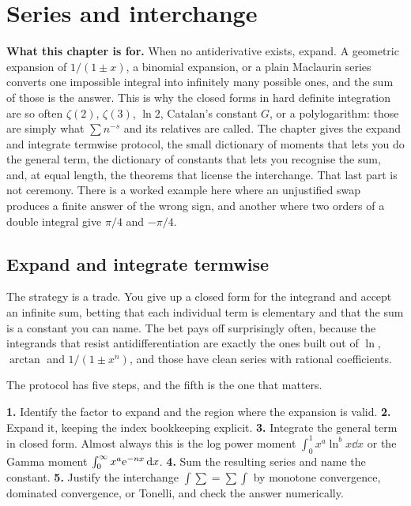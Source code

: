 \chapter{Series and interchange}

\begin{orient}
\textbf{What this chapter is for.} When no antiderivative exists, expand. A geometric expansion of $1/(1\pm x)$, a binomial expansion, or a plain Maclaurin series converts one impossible integral into infinitely many possible ones, and the sum of those is the answer. This is why the closed forms in hard definite integration are so often $\zeta(2)$, $\zeta(3)$, $\ln2$, Catalan's constant $G$, or a polylogarithm: those are simply what $\sum n^{-s}$ and its relatives are called. The chapter gives the expand and integrate termwise protocol, the small dictionary of moments that lets you do the general term, the dictionary of constants that lets you recognise the sum, and, at equal length, the theorems that license the interchange. That last part is not ceremony. There is a worked example here where an unjustified swap produces a finite answer of the wrong sign, and another where two orders of a double integral give $\pi/4$ and $-\pi/4$.
\end{orient}

\section{Expand and integrate termwise}

The strategy is a trade. You give up a closed form for the integrand and accept an infinite sum, betting that each individual term is elementary and that the sum is a constant you can name. The bet pays off surprisingly often, because the integrands that resist antidifferentiation are exactly the ones built out of $\ln$, $\arctan$ and $1/(1\pm x^{n})$, and those have clean series with rational coefficients.

The protocol has five steps, and the fifth is the one that matters.

\begin{keynote}
\textbf{1.} Identify the factor to expand and the region where the expansion is valid.
\textbf{2.} Expand it, keeping the index bookkeeping explicit.
\textbf{3.} Integrate the general term in closed form. Almost always this is the log power moment $\int_0^1x^{a}\ln^{b}x\dd x$ or the Gamma moment $\int_0^\infty x^{a}\mathrm{e}^{-nx}\,\mathrm{d} x$.
\textbf{4.} Sum the resulting series and name the constant.
\textbf{5.} Justify the interchange $\int\sum=\sum\int$ by monotone convergence, dominated convergence, or Tonelli, and check the answer numerically.
\end{keynote}

